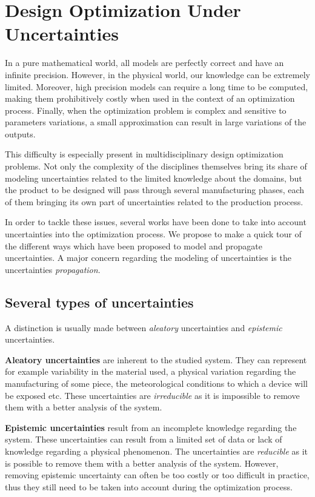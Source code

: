 \section{Design Optimization Under Uncertainties}\label{SOA_uncertainties}

In a pure mathematical world, all models are perfectly correct and have an infinite precision. However, in the physical world, our knowledge can be extremely limited. Moreover, high precision models can require a long time to be computed, making them prohibitively costly when used in the context of an optimization process. Finally, when the optimization problem is complex and sensitive to parameters variations, a small approximation can result in large variations of the outputs.

This difficulty is especially present in multidisciplinary design optimization problems. Not only the complexity of the disciplines themselves bring its share of modeling uncertainties related to the limited knowledge about the domains, but the product to be designed will pass through several manufacturing phases, each of them bringing its own part of uncertainties related to the production process.

In order to tackle these issues, several works have been done to take into account uncertainties into the optimization process. We propose to make a quick tour of the different ways which have been proposed to model and propagate uncertainties.
A major concern regarding the modeling of uncertainties is the uncertainties \emph{propagation}. 

\subsection{Several types of uncertainties}

A distinction is usually made between \emph{aleatory} uncertainties and \emph{epistemic} uncertainties.

\textbf{Aleatory uncertainties} are inherent to the studied system. They can represent for example variability in the material used, a physical variation regarding the manufacturing of some piece, the meteorological conditions to which a device will be exposed etc.
These uncertainties are \emph{irreducible} as it is impossible to remove them with a better analysis of the system.

\textbf{Epistemic uncertainties} result from an incomplete knowledge regarding the system. These uncertainties can result from a limited set of data or lack of knowledge regarding a physical phenomenon.
The uncertainties are \emph{reducible} as it is possible to remove them with a better analysis of the system. However, removing epistemic uncertainty can often be too costly or too difficult in practice, thus they still need to be taken into account during the optimization process.


